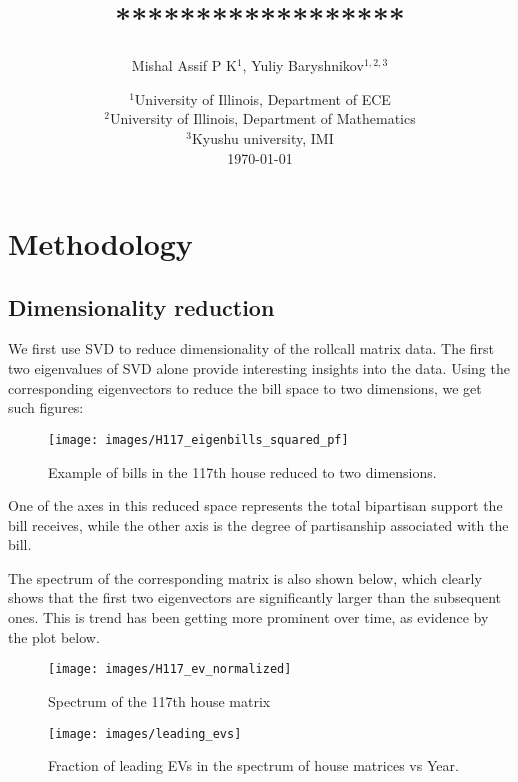 \documentclass[11pt, letter]{article}
\begin{document}

\title{******************}%



\author{Mishal Assif P K$^1$, Yuliy Baryshnikov$^{1,2,3}$ }
\date{%
    $^1$University of Illinois, Department of ECE\\%
    $^2$University of Illinois, Department of Mathematics\\
    $^3$Kyushu university, IMI\\[2ex]%
    \today
}


\maketitle
{}
\section{Methodology}
\subsection{Dimensionality reduction}
        We first use SVD to reduce dimensionality of the rollcall matrix data. The first
        two eigenvalues of SVD alone provide interesting insights into the data. 
        Using the corresponding eigenvectors to reduce the bill space to two dimensions,
        we get such figures:
        \begin{figure}[t]
        \texttt{[image: images/H117\_eigenbills\_squared\_pf]}
        \centering
        \caption{Example of bills in the 117th house reduced to two dimensions.}
        \end{figure}
        One of the axes in this reduced space represents the total bipartisan support 
        the bill receives, while the other axis is the degree of partisanship
        associated with the bill.
        
        The spectrum of the corresponding matrix is also shown below, which clearly shows that the first two eigenvectors are significantly larger than the subsequent ones. This is trend has been getting more prominent over time, as evidence by the plot below.
        \begin{figure}[t]
        \texttt{[image: images/H117\_ev\_normalized]}
        \centering
        \caption{Spectrum of the 117th house matrix}
        \end{figure}
        \begin{figure}[t]
            \texttt{[image: images/leading\_evs]}
        \centering
        \caption{Fraction of leading EVs in the spectrum of house matrices vs Year.}
        \end{figure}
\end{document}
